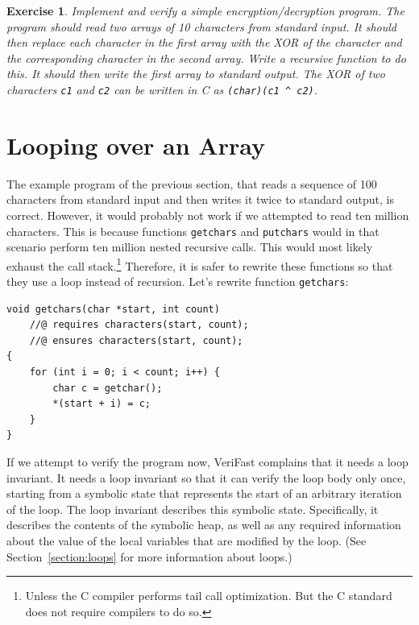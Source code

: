 \documentclass{article}
\newtheorem{exercise}{Exercise}
\begin{document}
\begin{exercise}\label{exercise:xor}
Implement and verify a simple encryption/decryption program. The program should read two arrays of 10 characters from standard input.
It should then replace each character in the first array with the XOR of the character and the corresponding character in the second array. Write a recursive function to do this.
It should then write the first array to standard output. The XOR of two characters \lstinline!c1! and \lstinline!c2! can be written in C as \lstinline!(char)(c1 ^ c2)!.
\end{exercise}

\section{Looping over an Array}\label{section:array-loops}

The example program of the previous section, that reads a sequence of 100 characters from standard input and then writes it twice to standard output,
is correct. However, it would probably not work if we attempted to read ten million characters. This is because functions \lstinline!getchars! and
\lstinline!putchars! would in that scenario perform ten million nested recursive calls. This would most likely exhaust the call stack.\footnote{Unless the
C compiler performs tail call optimization. But the C standard does not require compilers to do so.} Therefore, it is safer to rewrite these functions so that
they use a loop instead of recursion. Let's rewrite function \lstinline!getchars!:
\begin{lstlisting}
void getchars(char *start, int count)
    //@ requires characters(start, count);
    //@ ensures characters(start, count);
{
    for (int i = 0; i < count; i++) {
        char c = getchar();
        *(start + i) = c;
    }
}
\end{lstlisting}
If we attempt to verify the program now, VeriFast complains that it needs a loop invariant. It needs a loop invariant so that it can
verify the loop body only once, starting from a symbolic state that represents the start of an arbitrary iteration of the loop. The loop
invariant describes this symbolic state. Specifically, it describes the contents of the symbolic heap, as well as any required information
about the value of the local variables that are modified by the loop. (See Section~\ref{section:loops} for more information about loops.)
\end{document}
